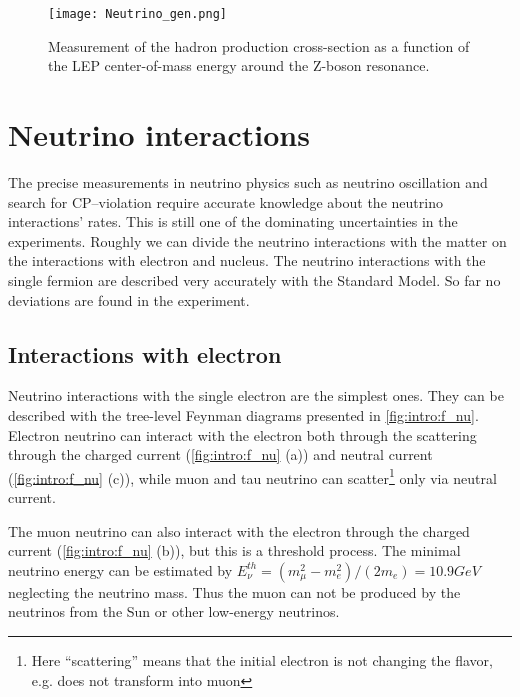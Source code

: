 \documentclass[../main.tex]{subfiles}
\begin{document}
\begin{figure}[!ht]
    \centering
    \texttt{[image: Neutrino\_gen.png]}
    \caption{Measurement of the hadron production cross-section as a function of the LEP center-of-mass energy around the Z-boson resonance.}
    \label{fig:intro:NuGen}
\end{figure}

\section{Neutrino interactions}
The precise measurements in neutrino physics such as neutrino oscillation and search for CP--violation require accurate knowledge about the neutrino interactions' rates. This is still one of the dominating uncertainties in the experiments. Roughly we can divide the neutrino interactions with the matter on the interactions with electron and nucleus. The neutrino interactions with the single fermion are described very accurately with the Standard Model. So far no deviations are found in the experiment.

\subsection{Interactions with electron}
Neutrino interactions with the single electron are the simplest ones. They can be described with the tree-level Feynman diagrams presented in \autoref{fig:intro:f_nu}. Electron neutrino can interact with the electron both through the scattering through the charged current (\autoref{fig:intro:f_nu} (a)) and neutral current (\autoref{fig:intro:f_nu} (c)), while muon and tau neutrino can scatter\footnote{Here ``scattering'' means that the initial electron is not changing the flavor, e.g. does not transform into muon} only via neutral current.

The muon neutrino can also interact with the electron through the charged current (\autoref{fig:intro:f_nu} (b)), but this is a threshold process. The minimal neutrino energy can be estimated by $E_\nu^{th}=\left(m_\mu^2-m_e^2\right)/\left(2m_e\right)=10.9GeV$ neglecting the neutrino mass. Thus the muon can not be produced by the neutrinos from the Sun or other low-energy neutrinos.
\end{document}

